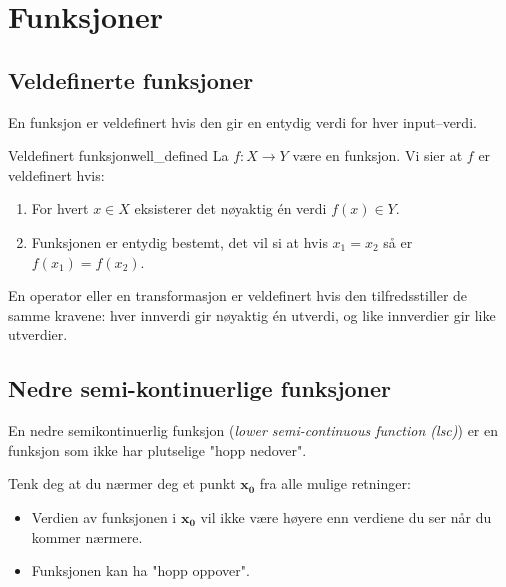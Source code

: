 \section{Funksjoner}

\subsection{Veldefinerte funksjoner}
En funksjon er veldefinert hvis den gir en entydig verdi for hver input--verdi.
\begin{definition}{Veldefinert funksjon}{well_defined}
	La \( f: X \to Y \) være en funksjon. Vi sier at \( f \) er veldefinert hvis:
	\begin{enumerate}
		\item For hvert \( x \in X \) eksisterer det nøyaktig én verdi \( f(x) \in Y \).
		\item Funksjonen er entydig bestemt, det vil si at hvis \( x_1 = x_2 \) så er \( f(x_1) = f(x_2) \).
	\end{enumerate}

	En operator eller en transformasjon er veldefinert hvis den tilfredsstiller de samme kravene: hver innverdi gir nøyaktig én utverdi, og like innverdier gir like utverdier.
\end{definition}

\subsection{Nedre semi-kontinuerlige funksjoner}
En nedre semikontinuerlig funksjon (\emph{lower semi-continuous function (lsc)}) er en funksjon som ikke har plutselige "hopp nedover".

Tenk deg at du nærmer deg et punkt \( \symbf{x_0} \) fra alle mulige retninger:
\begin{itemize}
	\item Verdien av funksjonen i \( \symbf{x_0} \) vil ikke være høyere enn verdiene du ser når du kommer nærmere.
	\item Funksjonen kan ha "hopp oppover".
\end{itemize}

